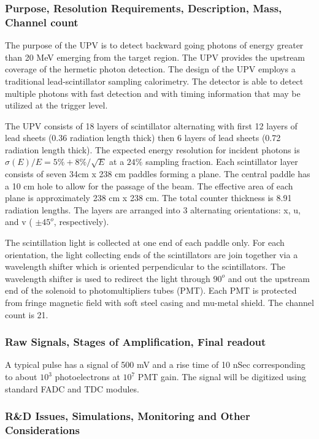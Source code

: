 \subsubsection*{Purpose, Resolution Requirements, Description, Mass, Channel count}

The purpose of the UPV is to detect backward going photons of energy greater than 20 MeV emerging from the target region. The UPV provides the upstream coverage of the hermetic photon detection. The design of the UPV employs a traditional lead-scintillator sampling calorimetry.   The detector is able to detect multiple photons with fast detection and with timing information that may be utilized at the trigger level.

The UPV consists of 18 layers of scintillator alternating with first 12 layers of lead sheets (0.36 radiation length thick) then 6 layers of  lead sheets (0.72 radiation length thick). The expected energy resolution for incident photons is $\sigma(E)/E = 5\% + 8\%/\sqrt{E}$ at a $24\%$ sampling fraction. Each  scintillator layer consists of seven 34cm x 238 cm paddles forming a plane. The central paddle has a 10 cm hole to allow for the passage of the beam. The effective area of each plane is approximately 238 cm x 238 cm. The total counter thickness is 8.91 radiation lengths.   The layers are arranged into 3 alternating orientations: x, u, and v ( $\pm45^o$, respectively).  


The scintillation light is collected at one end of each paddle only.  For each orientation, the light collecting ends of the scintillators are join together via a wavelength shifter which is oriented perpendicular to the  scintillators.  The wavelength shifter is used to redirect the light through $90^o$ and out the upstream end of the solenoid to photomultipliers tubes (PMT).  Each PMT is protected from fringe magnetic field with soft steel casing and mu-metal shield. The channel count is 21.

\subsubsection*{Raw Signals, Stages of Amplification, Final readout}

A typical pulse has a signal of 500 mV and a rise time of 10 nSec corresponding to about $10^3$ photoelectrons at $10^7$ PMT gain. The signal will be digitized using standard FADC and TDC modules.  

\subsubsection*{R\&D Issues, Simulations, Monitoring and Other Considerations}

